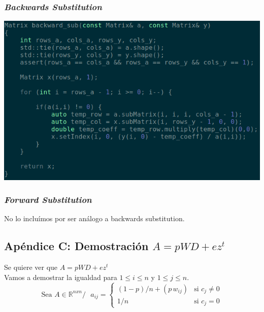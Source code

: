 

		\subsubsection{\textit{Backwards Substitution}}

			\includegraphics[scale=0.75]{img/src/backwards_substitution}


		\subsubsection{\textit{Forward Substitution}}

			No lo incluímos por ser análogo a backwards substitution. \\


	\subsection{Apéndice C: Demostración $A = pWD + ez^{t}$}

		Se quiere ver que $A = pWD + e z^{t}$ \\

		Vamos a demostrar la igualdad para $1 \leq i \leq n$ y $1 \leq j \leq n$. \\

		\[ \text{Sea $A \in \mathbb{R}^{nxn} /$ } a_{ij} =
		        \begin{cases}
		                (1-p)/n + (p \, w_{ij})         & \text{si } c_{j}  \neq 0 \\
		                1    /n                         & \text{si } c_{j}   =   0
		        \end{cases}
		\]

